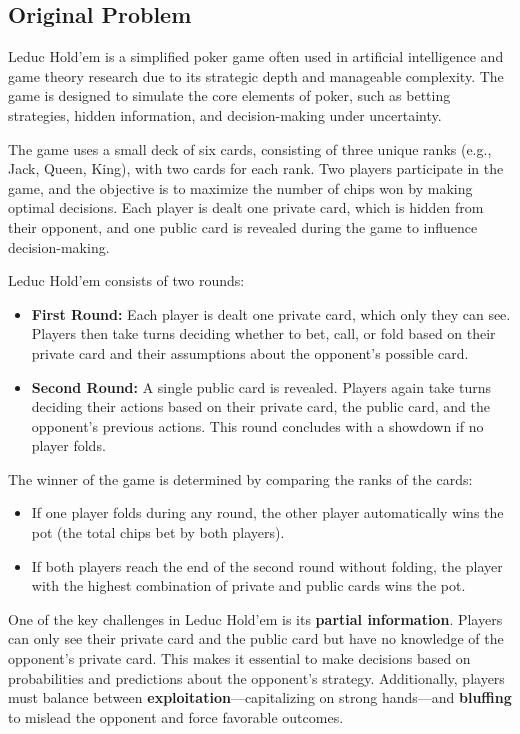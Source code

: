 \documentclass{article}
\begin{document}
\subsection{Original Problem}
Leduc Hold'em is a simplified poker game often used in artificial intelligence and game theory research due to its strategic depth and manageable complexity. The game is designed to simulate the core elements of poker, such as betting strategies, hidden information, and decision-making under uncertainty.

The game uses a small deck of six cards, consisting of three unique ranks (e.g., Jack, Queen, King), with two cards for each rank. Two players participate in the game, and the objective is to maximize the number of chips won by making optimal decisions. Each player is dealt one private card, which is hidden from their opponent, and one public card is revealed during the game to influence decision-making.

Leduc Hold'em consists of two rounds:
\begin{itemize}
    \item \textbf{First Round:} Each player is dealt one private card, which only they can see. Players then take turns deciding whether to bet, call, or fold based on their private card and their assumptions about the opponent's possible card.
    \item \textbf{Second Round:} A single public card is revealed. Players again take turns deciding their actions based on their private card, the public card, and the opponent's previous actions. This round concludes with a showdown if no player folds.
\end{itemize}

The winner of the game is determined by comparing the ranks of the cards:
\begin{itemize}
    \item If one player folds during any round, the other player automatically wins the pot (the total chips bet by both players).
    \item If both players reach the end of the second round without folding, the player with the highest combination of private and public cards wins the pot.
\end{itemize}

One of the key challenges in Leduc Hold'em is its \textbf{partial information}. Players can only see their private card and the public card but have no knowledge of the opponent's private card. This makes it essential to make decisions based on probabilities and predictions about the opponent's strategy. Additionally, players must balance between \textbf{exploitation}—capitalizing on strong hands—and \textbf{bluffing} to mislead the opponent and force favorable outcomes.
\end{document}
